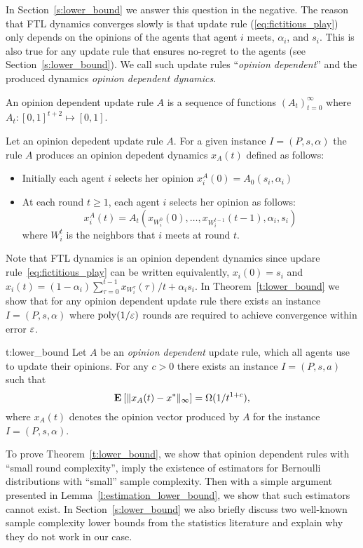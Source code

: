 In Section~\ref{s:lower_bound} we answer this question in the negative.
The reason that FTL dynamics converges slowly is that
update rule (\ref{eq:fictitious_play})
only depends on the opinions of the agents that agent $i$ meets,
$\alpha_i$, and $s_i$. This is also true for any update rule that
ensures no-regret to the agents (see Section~\ref{s:lower_bound}).
We call such update rules \enquote{\emph{opinion dependent}}
and the produced dynamics \emph{opinion dependent dynamics}.

\begin{definition}\label{d:opinion_dependent_dynamics}
An opinion dependent update rule $A$ is a sequence of 
functions $(A_t)_{t=0}^\infty$ where
$A_t: [0,1]^{t+2}\mapsto [0,1]$.
\end{definition}

\begin{definition}\label{d:opinion_dependent_dynamics}
Let an opinion depedent update rule $A$. For a given instance $I=(P,s,\alpha)$
the rule $A$ produces an opinion depedent dynamics $x_A(t)$ defined as follows:
\begin{itemize}
 \item Initially each agent $i$ selects her opinion $x_i^A(0)=A_0(s_i,\alpha_i)$
 \item At each round $t\geq 1$, each agent $i$ selects her opinion as follows:
 \[x_i^A(t)=A_t(x_{W_i^0}(0),\dots,x_{W_i^{t-1}}(t-1),\alpha_i,s_i)\]
where $W_i^t$ is the neighbors that $i$ meets at round $t$.
\end{itemize}
\end{definition}

Note that FTL dynamics is an opinion dependent dynamics
since updare rule~\ref{eq:fictitious_play} can 
be written equivalently, $x_i(0)=s_i$ and $x_i(t)=(1-\alpha_i)\sum_{\tau=0}^{t-1}x_{W_i^\tau}(\tau)/t + \alpha_i s_i$.
In Theorem~\ref{t:lower_bound} we
show that for any opinion dependent update rule there exists an instance
$I = (P,s,\alpha)$ where $\mathrm{poly}(1/\varepsilon)$ rounds are required to
achieve convergence within error $\varepsilon$.
\begin{reptheorem}{t:lower_bound}
  Let $A$ be an \emph{opinion dependent} update rule, which all
  agents use to update their opinions.
  For any $c>0$ there exists an instance $I=(P,s,a)$ such that
  \[
    \Exp{\norm{\infty}{x_A(t) - x^*}} = \Omega(1/t^{1+c}),
  \]
  where $x_A(t)$ denotes the opinion vector produced by $A$
  for the instance $I=(P,s,\alpha)$.
\end{reptheorem}
%
To prove Theorem~\ref{t:lower_bound}, we show that opinion dependent rules with
\enquote{small round complexity}, imply the existence
of estimators for Bernoulli distributions with
\enquote{small} sample complexity. Then with a simple argument
presented in Lemma~\ref{l:estimation_lower_bound},
we show that such estimators cannot exist.
In Section~\ref{s:lower_bound} we also
briefly discuss two well-known sample complexity lower bounds
from the statistics literature and explain why they do not work in our case.

